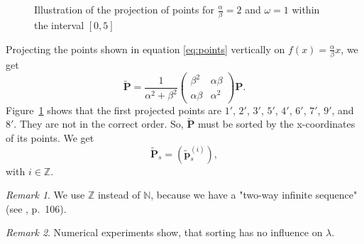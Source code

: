 \documentclass[11pt]{article}
\theoremstyle{remark}
\newtheorem{remark}{Remark}
\begin{document}
\begin{figure}[htbp]
    \centering
	\caption{Illustration of the projection of points for $\frac{\alpha}{\beta} = 2$ and $\omega = 1$ within the interval $[0, 5]$}
    \label{fig:a2o1}
\end{figure}
%
Projecting the points shown in equation \ref{eq:points} vertically on $f(x) = \frac{\alpha}{\beta} x$, we get
%
\begin{equation}
\mathbf{\tilde{P}}
= \frac{1}{\alpha^2 + \beta^2} \begin{pmatrix} \beta^2 & \alpha \beta \\ \alpha \beta & \alpha^2 \end{pmatrix} \mathbf{P}.\label{eq:c}
\end{equation}
%
Figure~\ref{fig:a2o1} shows that the first projected points are $1'$, $2'$, $3'$, $5'$, $4'$, $6'$, $7'$, $9'$, and $8'$. They are not in the correct order. So, $\mathbf{\tilde{P}}$ must be sorted by the x-coordinates of its points. We get
\begin{equation}
\mathbf{\tilde{P}}_s = \left(\mathbf{\tilde{p}}_s^{(i)} \right),\label{eq:sort}
\end{equation}
with $i \in \mathbb{Z}$.
%
\begin{remark}
We use $\mathbb{Z}$ instead of $\mathbb{N}$, because we have a "two-way infinite sequence" (see \cite{Senechal2009}, p.~106).
\end{remark}
%
\begin{remark}
Numerical experiments show, that sorting has no influence on $\lambda$.
\end{remark}
\end{document}
